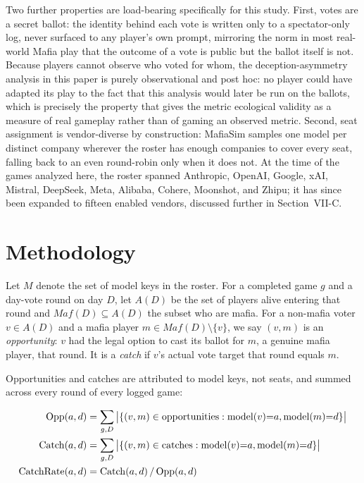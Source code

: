\documentclass[10pt,conference]{IEEEtran}
\begin{document}
Two further properties are load-bearing specifically for this study. First, votes are a secret ballot: the identity behind each vote is written only to a spectator-only log, never surfaced to any player's own prompt, mirroring the norm in most real-world Mafia play that the outcome of a vote is public but the ballot itself is not. Because players cannot observe who voted for whom, the deception-asymmetry analysis in this paper is purely observational and post hoc: no player could have adapted its play to the fact that this analysis would later be run on the ballots, which is precisely the property that gives the metric ecological validity as a measure of real gameplay rather than of gaming an observed metric. Second, seat assignment is vendor-diverse by construction: MafiaSim samples one model per distinct company wherever the roster has enough companies to cover every seat, falling back to an even round-robin only when it does not. At the time of the games analyzed here, the roster spanned Anthropic, OpenAI, Google, xAI, Mistral, DeepSeek, Meta, Alibaba, Cohere, Moonshot, and Zhipu; it has since been expanded to fifteen enabled vendors, discussed further in Section~VII-C.

\section{Methodology}

Let $M$ denote the set of model keys in the roster. For a completed game $g$ and a day-vote round on day $D$, let $A(D)$ be the set of players alive entering that round and $\mathit{Maf}(D) \subseteq A(D)$ the subset who are mafia. For a non-mafia voter $v \in A(D)$ and a mafia player $m \in \mathit{Maf}(D) \setminus \{v\}$, we say $(v,m)$ is an \textit{opportunity}: $v$ had the legal option to cast its ballot for $m$, a genuine mafia player, that round. It is a \textit{catch} if $v$'s actual vote target that round equals $m$.

Opportunities and catches are attributed to model keys, not seats, and summed across every round of every logged game:

\begin{align}
\mathrm{Opp}(a,d) &= \sum_{g,D} \big|\{(v,m) \in \mathrm{opportunities} : \mathrm{model}(v){=}a, \mathrm{model}(m){=}d\}\big| \notag\\
\mathrm{Catch}(a,d) &= \sum_{g,D} \big|\{(v,m) \in \mathrm{catches} : \mathrm{model}(v){=}a, \mathrm{model}(m){=}d\}\big| \notag\\
\mathrm{CatchRate}(a,d) &= \mathrm{Catch}(a,d) \,/\, \mathrm{Opp}(a,d) \notag
\end{align}
\end{document}
